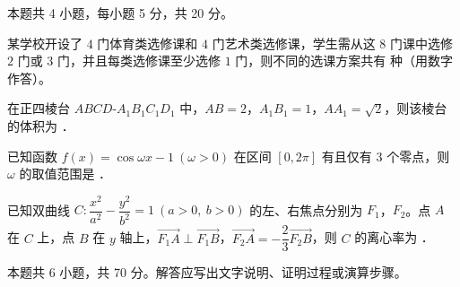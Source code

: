 \begin{gktip}
本题共 4 小题，每小题 5 分，共 20 分。
\end{gktip}

\begin{question}
某学校开设了 $4$ 门体育类选修课和 $4$ 门艺术类选修课，学生需从这 $8$ 门课中选修 $2$ 门或 $3$ 门，并且每类选修课至少选修 $1$ 门，则不同的选课方案共有 \gkblank{} 种（用数字作答）。

\end{question}
\begin{question}
在正四棱台 $ABCD\text{-}A_1B_1C_1D_1$ 中，$AB=2$，$A_1B_1=1$，$AA_1=\sqrt2$，则该棱台的体积为 \gkblank{}．

\end{question}
\begin{question}
已知函数 $f(x)=\cos\omega x-1\ (\omega>0)$ 在区间 $[0,2\pi]$ 有且仅有 $3$ 个零点，则 $\omega$ 的取值范围是 \gkblank{}．

\end{question}
\begin{question}
已知双曲线 $C:\dfrac{x^{2}}{a^{2}}-\dfrac{y^{2}}{b^{2}}=1\ (a>0,\ b>0)$ 的左、右焦点分别为 $F_1$，$F_2$。点 $A$ 在 $C$ 上，点 $B$ 在 $y$ 轴上，$\overrightarrow{F_1A}\perp\overrightarrow{F_1B}$，$\overrightarrow{F_2A}=-\dfrac23\overrightarrow{F_2B}$，则 $C$ 的离心率为 \gkblank{}．

\par\medskip

\end{question}

\begin{gktip}
本题共 6 小题，共 70 分。解答应写出文字说明、证明过程或演算步骤。
\end{gktip}

